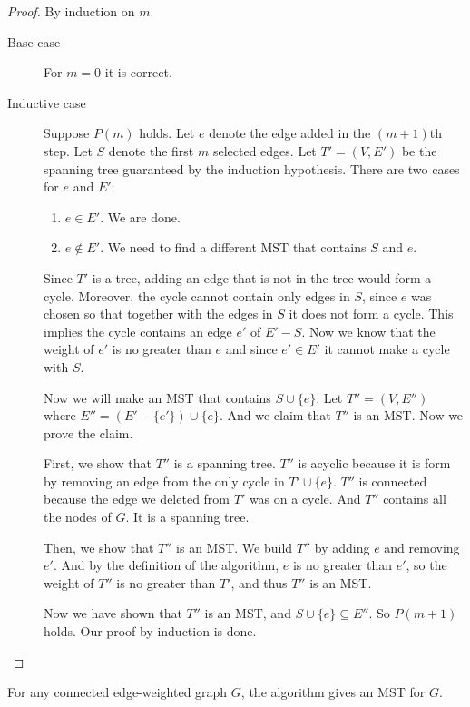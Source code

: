 \documentclass[11pt]{article}
\begin{document}
\begin{proof}
By induction on $m$.

\begin{description}
\item[Base case] For $m=0$ it is correct.
\item[Inductive case] Suppose $P(m)$ holds. Let $e$ denote the edge added in the $(m+1)$th step.
Let $S$ denote the first $m$ selected edges. Let $T'=(V,E')$ be the spanning tree guaranteed by the
induction hypothesis. There are two cases for $e$ and $E'$:
\begin{enumerate}
\item $e \in E'$. We are done.
\item $e \not\in E'$. We need to find a different MST that contains $S$ and $e$.
\end{enumerate}

Since $T'$ is a tree, adding an edge that is not in the tree would form a cycle. Moreover, the cycle
cannot contain only edges in $S$, since $e$ was chosen so that together with the edges in $S$ it does
not form a cycle. This implies the cycle contains an edge $e'$ of $E'-S$. Now we know that the weight
of $e'$ is no greater than $e$ and since $e' \in E'$ it cannot make a cycle with $S$.

Now we will make an MST that contains $S \cup \{e\}$. Let $T''=(V,E'')$ where $E''=(E'-\{e'\})\cup
\{e\}$. And we claim that $T''$ is an MST. Now we prove the claim.

First, we show that $T''$ is a spanning tree. $T''$ is acyclic because it is form by removing an edge
from the only cycle in $T' \cup \{e\}$. $T''$ is connected because the edge we deleted from $T'$ was on
a cycle. And $T''$ contains all the nodes of $G$. It is a spanning tree.

Then, we show that $T''$ is an MST. We build $T''$ by adding $e$ and removing $e'$. And by the
definition of the algorithm, $e$ is no greater than $e'$, so the weight of $T''$ is no greater than
$T'$, and thus $T''$ is an MST.

Now we have shown that $T''$ is an MST, and $S \cup \{e\} \subseteq E''$. So $P(m+1)$ holds. Our proof
by induction is done.
\end{description}
\end{proof}

\begin{theorem}
For any connected edge-weighted graph $G$, the algorithm gives an MST for $G$.
\end{theorem}
\end{document}
